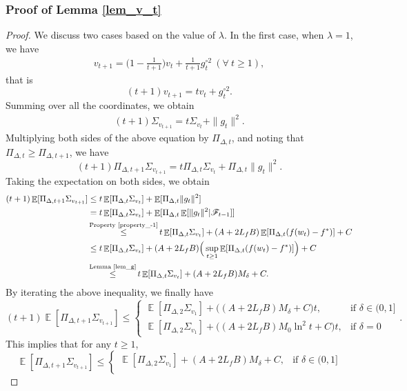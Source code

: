 \documentclass{article} %
\DeclareMathOperator{\Expect}{\mathbb{E}}
\begin{document}
\subsubsection{Proof of Lemma \ref{lem_v_t}}
\begin{proof}
We discuss two cases based on the value of $\lambda$. In the first case, when $\lambda = 1$, we have
\begin{align*}
v_{t+1}=\Big(1-\frac{1}{t+1}\Big)v_{t}+\frac{1}{t+1}g_{t}^{\circ 2}\ (\forall\ t\ge 1),
\end{align*}
that is
\[(t+1)v_{t+1}=tv_{t}+g_{t}^{\circ 2}.\]
Summing over all the coordinates, we obtain
\begin{align}\label{v_t}
(t+1)\Sigma_{v_{t+1}}=t\Sigma_{v_{t}}+\|g_{t}\|^{2}.
\end{align}
Multiplying both sides of the above equation by $\Pi_{\Delta,t}$, and noting that $\Pi_{\Delta,t} \geq \Pi_{\Delta,t+1}$, we have
\[(t+1)\Pi_{\Delta,t+1}\Sigma_{v_{t+1}}=t\Pi_{\Delta,t}\Sigma_{v_{t}}+\Pi_{\Delta,t}\|g_{t}\|^{2}.\]
Taking the expectation on both sides, we obtain
\begin{align*}
(t+1)\Expect[\Pi_{\Delta,t+1}\Sigma_{v_{t+1}}]&\le t\Expect[\Pi_{\Delta,t}\Sigma_{v_{t}}]+\Expect[\Pi_{\Delta,t}\|g_{t}\|^{2}]\\&=t\Expect[\Pi_{\Delta,t}\Sigma_{v_{t}}]+\Expect[\Pi_{\Delta,t}\Expect[\|g_{t}\|^{2}|\mathscr{F}_{t-1}]]\\&\mathop{\le}^{\text{Property \ref{property_-1}}}t\Expect[\Pi_{\Delta,t}\Sigma_{v_{t}}]+(A+2L_{f}B)\Expect[\Pi_{\Delta,t}(f(w_{t})-f^*)]+C\\&\le t\Expect[\Pi_{\Delta,t}\Sigma_{v_{t}}]+(A+2L_{f}B)\Big(\sup_{t\ge 1}\Expect[\Pi_{\Delta,t}(f(w_{t})-f^*)]\Big)+C \\&\mathop{\le}^{\text{Lemma \ref{lem_g}}}t\Expect[\Pi_{\Delta,t}\Sigma_{v_{t}}]+(A+2L_{f}B)M_{\delta}+C.
\end{align*}
By iterating the above inequality, we finally have
\[
(t+1)\Expect[\Pi_{\Delta,t+1}\Sigma_{v_{t+1}}]\le \begin{cases} 
\Expect[\Pi_{\Delta,2}\Sigma_{v_{1}}]+\big((A+2L_{f}B)M_{\delta}+C\big)t, & \text{if } \delta \in (0,1] \\
\Expect[\Pi_{\Delta,2}\Sigma_{v_{1}}]+\big((A+2L_{f}B)M_{0}\ln^{2}t+C\big)t, & \text{if } \delta = 0
\end{cases}.
\]
This implies that for any $t \geq 1$,
\[\Expect[\Pi_{\Delta,t+1}\Sigma_{v_{t+1}}]\le \begin{cases} 
\Expect[\Pi_{\Delta,2}\Sigma_{v_{1}}]+(A+2L_{f}B)M_{\delta}+C, & \text{if } \delta \in (0,1] \\

\end{cases}\]
\end{proof}
\end{document}
